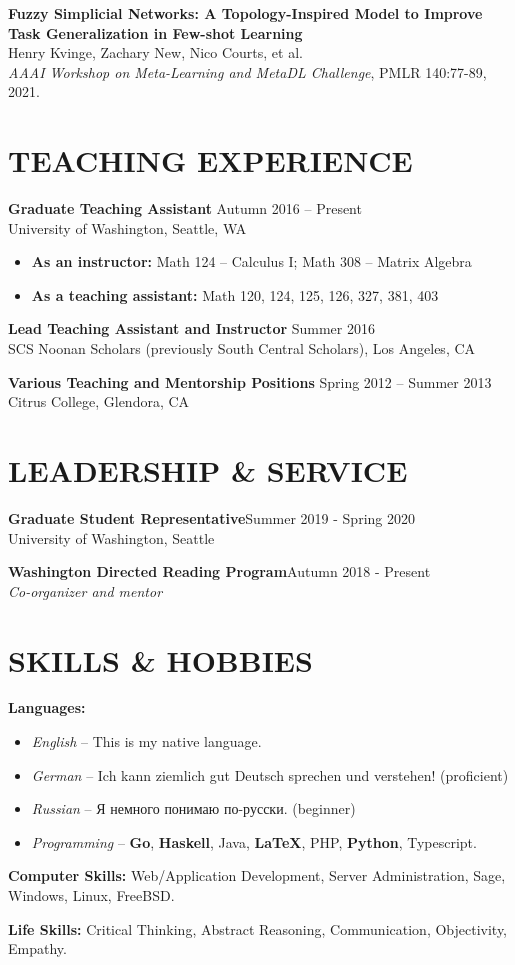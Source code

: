 \documentclass[margin]{res} %
\begin{document}
\begin{resume}
\textbf{Fuzzy Simplicial Networks: A Topology-Inspired Model to Improve Task Generalization in Few-shot Learning}\\
Henry Kvinge, Zachary New, Nico Courts, et al.\\
\textit{AAAI Workshop on Meta-Learning and MetaDL Challenge}, PMLR 140:77-89, 2021.

\section{TEACHING EXPERIENCE}

{\bf Graduate Teaching Assistant} \hfill Autumn 2016 -- Present \\
University of Washington, Seattle, WA

\begin{itemize} \itemsep -1pt %
\item\textbf{As an instructor:} Math 124 -- Calculus I; Math 308 -- Matrix Algebra
\item \textbf{As a teaching assistant:} Math 120, 124, 125, 126, 327, 381, 403
\end{itemize}
 
{\bf Lead Teaching Assistant and Instructor} \hfill Summer 2016 \\
SCS Noonan Scholars (previously South Central Scholars), Los Angeles, CA

{\bf Various Teaching and Mentorship Positions} \hfill Spring 2012 -- Summer 2013 \\
Citrus College, Glendora, CA

\section{LEADERSHIP \& SERVICE}

{\bf Graduate Student Representative}\hfill Summer 2019 - Spring 2020\\
University of Washington, Seattle


{\bf Washington Directed Reading Program}\hfill Autumn 2018 - Present\\
{\sl Co-organizer and mentor}


\section{SKILLS \& HOBBIES} 

{\bf Languages:}
\begin{itemize} \itemsep -2pt
	\item {\sl English} -- This is my native language.
	\item {\sl German} -- Ich kann ziemlich gut Deutsch sprechen und verstehen! (proficient)
	\item {\sl Russian} -- \foreignlanguage{russian}{Я немного понимаю по-русски.} (beginner)
	\item {\sl Programming} -- {\bf Go}, {\bf Haskell}, Java, {\bf \LaTeX}, PHP, {\bf Python}, Typescript.
\end{itemize}
{\bf Computer Skills:} Web/Application Development, Server Administration, Sage, Windows, Linux, FreeBSD.

{\bf Life Skills:} Critical Thinking, Abstract Reasoning, Communication, Objectivity, Empathy.

\end{resume}
\end{document}
